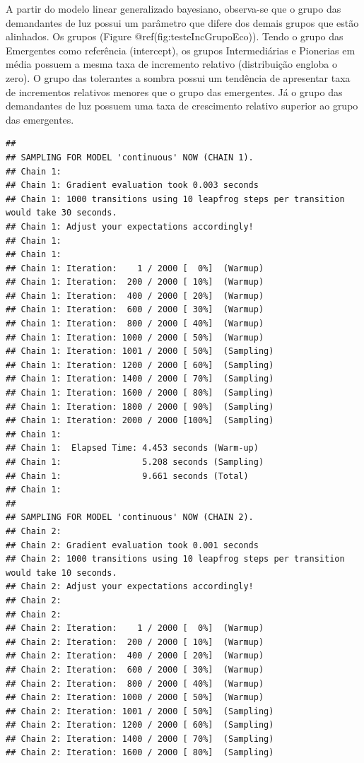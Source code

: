 \documentclass[
]{article}
\begin{document}
A partir do modelo linear generalizado bayesiano, observa-se que o grupo
das demandantes de luz possui um parâmetro que difere dos demais grupos
que estão alinhados. Os grupos (Figure @ref(fig:testeIncGrupoEco)).
Tendo o grupo das Emergentes como referência (intercept), os grupos
Intermediárias e Pionerias em média possuem a mesma taxa de incremento
relativo (distribuição engloba o zero). O grupo das tolerantes a sombra
possui um tendência de apresentar taxa de incrementos relativos menores
que o grupo das emergentes. Já o grupo das demandantes de luz possuem
uma taxa de crescimento relativo superior ao grupo das emergentes.

\begin{verbatim}
## 
## SAMPLING FOR MODEL 'continuous' NOW (CHAIN 1).
## Chain 1: 
## Chain 1: Gradient evaluation took 0.003 seconds
## Chain 1: 1000 transitions using 10 leapfrog steps per transition would take 30 seconds.
## Chain 1: Adjust your expectations accordingly!
## Chain 1: 
## Chain 1: 
## Chain 1: Iteration:    1 / 2000 [  0%]  (Warmup)
## Chain 1: Iteration:  200 / 2000 [ 10%]  (Warmup)
## Chain 1: Iteration:  400 / 2000 [ 20%]  (Warmup)
## Chain 1: Iteration:  600 / 2000 [ 30%]  (Warmup)
## Chain 1: Iteration:  800 / 2000 [ 40%]  (Warmup)
## Chain 1: Iteration: 1000 / 2000 [ 50%]  (Warmup)
## Chain 1: Iteration: 1001 / 2000 [ 50%]  (Sampling)
## Chain 1: Iteration: 1200 / 2000 [ 60%]  (Sampling)
## Chain 1: Iteration: 1400 / 2000 [ 70%]  (Sampling)
## Chain 1: Iteration: 1600 / 2000 [ 80%]  (Sampling)
## Chain 1: Iteration: 1800 / 2000 [ 90%]  (Sampling)
## Chain 1: Iteration: 2000 / 2000 [100%]  (Sampling)
## Chain 1: 
## Chain 1:  Elapsed Time: 4.453 seconds (Warm-up)
## Chain 1:                5.208 seconds (Sampling)
## Chain 1:                9.661 seconds (Total)
## Chain 1: 
## 
## SAMPLING FOR MODEL 'continuous' NOW (CHAIN 2).
## Chain 2: 
## Chain 2: Gradient evaluation took 0.001 seconds
## Chain 2: 1000 transitions using 10 leapfrog steps per transition would take 10 seconds.
## Chain 2: Adjust your expectations accordingly!
## Chain 2: 
## Chain 2: 
## Chain 2: Iteration:    1 / 2000 [  0%]  (Warmup)
## Chain 2: Iteration:  200 / 2000 [ 10%]  (Warmup)
## Chain 2: Iteration:  400 / 2000 [ 20%]  (Warmup)
## Chain 2: Iteration:  600 / 2000 [ 30%]  (Warmup)
## Chain 2: Iteration:  800 / 2000 [ 40%]  (Warmup)
## Chain 2: Iteration: 1000 / 2000 [ 50%]  (Warmup)
## Chain 2: Iteration: 1001 / 2000 [ 50%]  (Sampling)
## Chain 2: Iteration: 1200 / 2000 [ 60%]  (Sampling)
## Chain 2: Iteration: 1400 / 2000 [ 70%]  (Sampling)
## Chain 2: Iteration: 1600 / 2000 [ 80%]  (Sampling)

\end{verbatim}
\end{document}
